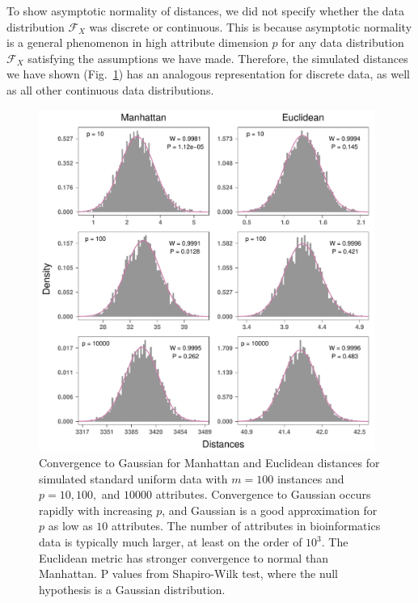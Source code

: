\documentclass[aoas]{imsart}
\begin{document}
To show asymptotic normality of distances, we did not specify whether the data distribution $\mathcal{F}_X$ was discrete or continuous. This is because asymptotic normality is a general phenomenon in high attribute dimension $p$ for any data distribution $\mathcal{F}_X$ satisfying the assumptions we have made. Therefore, the simulated distances we have shown (Fig.~\ref{fig:central_limit_convergence}) has an analogous representation for discrete data, as well as all other continuous data distributions.
%
%
\begin{figure}[H]
	\centering
	\includegraphics[width=0.98\textwidth]{central_limit_hist_uniform-data.pdf}
	\caption{Convergence to Gaussian for Manhattan and Euclidean distances for simulated standard uniform data with $m=100$ instances and $p=10, 100,$ and $10000$ attributes. Convergence to Gaussian occurs rapidly with increasing $p$, and Gaussian is a good approximation for $p$ as low as $10$ attributes. The number of attributes in bioinformatics data is typically much larger, at least on the order of $10^3$. The Euclidean metric has stronger convergence to normal than Manhattan.  P values from Shapiro-Wilk test, where the null hypothesis is a Gaussian distribution.}
	\label{fig:central_limit_convergence}
\end{figure}
\end{document}
